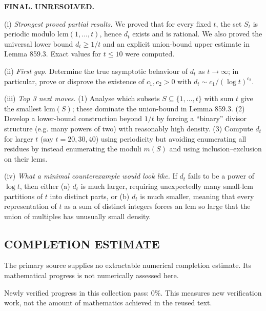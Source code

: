 \medskip
\noindent\textbf{FINAL.} \textbf{UNRESOLVED.}

(i) \emph{Strongest proved partial results.}
We proved that for every fixed $t$, the set $S_t$ is periodic modulo $\mathrm{lcm}(1,\dots,t)$, hence $d_t$ exists and is rational.
We also proved the universal lower bound $d_t\ge 1/t$ and an explicit union-bound upper estimate in Lemma 859.3.
Exact values for $t\le 10$ were computed.

(ii) \emph{First gap.}
Determine the true asymptotic behaviour of $d_t$ as $t\to\infty$; in particular, prove or disprove the existence of $c_1,c_2>0$ with $d_t\sim c_1/(\log t)^{c_2}$.

(iii) \emph{Top 3 next moves.}
(1) Analyse which subsets $S\subseteq\{1,\dots,t\}$ with sum $t$ give the smallest $\mathrm{lcm}(S)$; these dominate the union-bound in Lemma 859.3.
(2) Develop a lower-bound construction beyond $1/t$ by forcing a ``binary'' divisor structure (e.g. many powers of two) with reasonably high density.
(3) Compute $d_t$ for larger $t$ (say $t=20,30,40$) using periodicity but avoiding enumerating all residues by instead enumerating the moduli $m(S)$ and using inclusion--exclusion on their lcms.

(iv) \emph{What a minimal counterexample would look like.}
If $d_t$ fails to be a power of $\log t$, then either (a) $d_t$ is much larger, requiring unexpectedly many small-lcm partitions of $t$ into distinct parts, or (b) $d_t$ is much smaller, meaning that every representation of $t$ as a sum of distinct integers forces an lcm so large that the union of multiples has unusually small density.




\subsection*{COMPLETION ESTIMATE}
The primary source supplies no extractable numerical completion estimate. Its mathematical progress is not numerically assessed here.

Newly verified progress in this collection pass: $0\%$. This measures new verification work, not the amount of mathematics achieved in the reused text.
